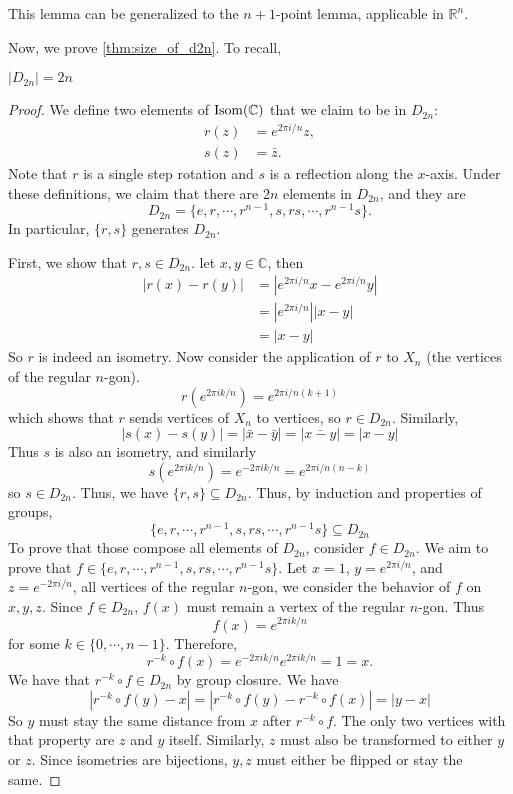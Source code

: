\documentclass[12pt]{article}
\begin{document}
This lemma can be generalized to the $n+1$-point lemma,
applicable in $\mathbb{R}^{n}$.

Now, we prove \autoref{thm:size_of_d2n}. To recall,
\begin{theorem*}
    $|D_{2n}| = 2n$
\end{theorem*}

\begin{proof}
    We define two elements of $\operatorname{Isom}(\mathbb{C})$ that we claim to be in $D_{2n}$:
    \begin{align*}
        r(z) &= e^{2\pi i / n} z,\\
        s(z) &= \bar z.
    \end{align*}
    Note that $r$ is a single step rotation
    and $s$ is a reflection along the $x$-axis.
    Under these definitions, we claim that there are $2n$
    elements in $D_{2n}$, and they are
    \[
    D_{2n} = \{e,r,\cdots,r^{n-1},s,rs,\cdots,r^{n-1}s\}.
    \]
    In particular, $\{r,s\}$ generates $D_{2n}$.

    First, we show that $r,s \in D_{2n}$.
    let $x,y \in \mathbb{C}$, then
    \begin{align*}
    |r(x) - r(y)| &= |e^{2\pi i/n}x - e^{2\pi i/n}y|\\
                  &= |e^{2\pi i/n}||x - y|\\
                  &= |x - y|
    \end{align*}
    So $r$ is indeed an isometry. Now consider the
    application of $r$ to $X_n$ (the vertices of the regular $n$-gon).
    \[
    r(e^{2\pi i k / n}) = e^{2 \pi i / n (k + 1)}
    \]
    which shows that $r$ sends vertices of $X_n$ to vertices,
    so $r \in D_{2n}$. Similarly,
    \[
        |s(x) - s(y)| = |\bar x - \bar y| = |\bar{x - y}| = |x - y|
    \]
    Thus $s$ is also an isometry, and similarly
    \[
    s(e^{2\pi i k / n}) = e^{-2\pi i k / n} = e^{2\pi i / n (n - k)}
    \]
    so $s \in D_{2n}$. Thus, we have $\{r,s\} \subseteq D_{2n}$.
    Thus, by induction and properties of groups,
    \[
    \{e,r,\cdots,r^{n-1},s,rs,\cdots,r^{n-1}s\} \subseteq D_{2n}
    \]
    To prove that those compose all elements of $D_{2n}$, 
    consider $f \in D_{2n}$. We aim to prove that $f \in \{e,r,\cdots,r^{n-1},s,rs,\cdots,r^{n-1}s\}$.
    Let $x = 1$, $y = e^{2\pi i / n}$, and $z = e^{-2\pi i/n}$, all
    vertices of the regular $n$-gon, we consider the behavior of $f$ on $x,y,z$.
    Since $f \in D_{2n}$, $f(x)$ must remain a vertex of the regular $n$-gon. Thus
    \[
    f(x) = e^{2\pi i k/n}
    \]
    for some $k \in \{0,\cdots,n-1\}$. Therefore,
    \[
    r^{-k}\circ f(x) = e^{-2\pi i k/n} e^{2\pi i k/n} = 1 = x.
    \]
    We have that $r^{-k} \circ f \in D_{2n}$ by group closure. We have
    \[
    |r^{-k}\circ f(y) - x| = |r^{-k}\circ f(y) - r^{-k}\circ f(x)| = |y - x|
    \]
    So $y$ must stay the same distance from $x$ after $r^{-k}\circ f$.
    The only two vertices with that property are $z$ and $y$ itself.
    Similarly, $z$ must also be transformed to either $y$ or $z$.
    Since isometries are bijections, $y,z$ must either be flipped
    or stay the same. 


\end{proof}
\end{document}

